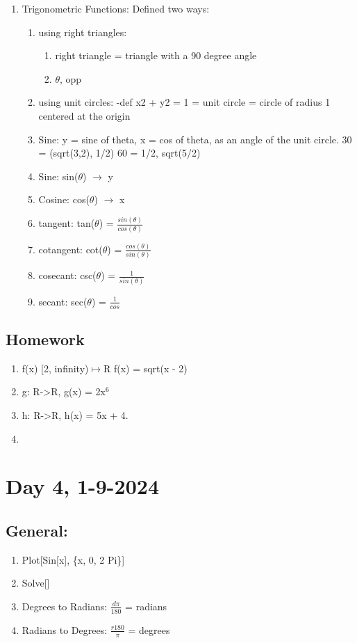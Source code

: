 \documentclass[12pt]{article}
\begin{document}
\begin{enumerate}
    \item Trigonometric Functions: Defined two ways:
    \begin{enumerate}
        \item using right triangles:
        \begin{enumerate}
            \item right triangle = triangle with a 90 degree angle
            \item \(\theta\), opp
        \end{enumerate}
        \item using unit circles: -def x2 + y2 = 1 = unit circle = circle of radius 1 centered at the origin
        \item Sine: y = sine of theta, x = cos of theta, as an angle of the unit circle. 30 = (sqrt(3,2), 1/2) 60 = 1/2, sqrt(5/2)
        \item Sine: sin(\(\theta\)) \(\rightarrow\) y
        \item Cosine: cos(\(\theta\)) \(\rightarrow\) x
        \item tangent: tan(\(\theta\)) = \(\frac{sin(\theta)}{cos(\theta)}\)
        \item cotangent: cot(\(\theta\)) = \(\frac{cos(\theta)}{sin(\theta)}\)
        \item cosecant: csc(\(\theta\)) = \(\frac{1}{sin(\theta)}\)
        \item secant: sec(\(\theta\)) = \(\frac{1}{cos}\)
    \end{enumerate}
\end{enumerate}
\subsection{Homework}
\begin{enumerate}
    \item f(x) [2, infinity)\(\mapsto\)R f(x) = sqrt(x - 2)
    \item g: R->R, g(x) = 2x\(^6\)
    \item h: R->R, h(x) = 5x + 4.
    \item 
\end{enumerate}
\section{Day 4, 1-9-2024}
\subsection{General: }
\begin{enumerate}
    \item Plot[Sin[x], \{x, 0, 2 Pi\}]
    \item Solve[]
    \item Degrees to Radians: \(\frac{d\pi}{180}\) = radians
    \item Radians to Degrees: \(\frac{r180}{\pi}\) = degrees
\end{enumerate}
\end{document}
